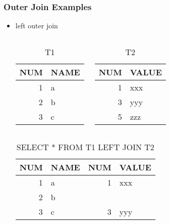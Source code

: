 \documentclass[dvipsnames]{beamer}
\theoremstyle{plain}
\begin{document}
\begin{frame}[fragile]
  \frametitle{Outer Join Examples}

  \begin{itemize}
    \item left outer join
    \begin{columns}[t]
      \begin{tiny}
      \begin{table}
        \caption{T1}
        \begin{tabular}{|r|l|}\hline
NUM & NAME \\\hline\hline
  1 & a    \\\hline
  2 & b    \\\hline
  3 & c    \\\hline
        \end{tabular}
      \end{table}
      \end{tiny}

      \begin{tiny}
      \begin{table}
        \caption{T2}
        \begin{tabular}{|r|l|}\hline
NUM & VALUE \\\hline\hline
  1 & xxx   \\\hline
  3 & yyy   \\\hline
  5 & zzz   \\\hline
        \end{tabular}
      \end{table}
      \end{tiny}
    \end{columns}

    \pause
    \begin{center}
      \begin{tiny}
      \begin{table}
        \caption{SELECT * FROM T1 LEFT JOIN T2}
        \begin{tabular}{|r|l|r|l|}\hline
NUM & NAME & NUM & VALUE \\\hline\hline
  1 & a    &   1 & xxx   \\\hline
  2 & b    &     &       \\\hline
  3 & c    &   3 & yyy   \\\hline
        \end{tabular}
      \end{table}
      \end{tiny}
    \end{center}
  \end{itemize}
\end{frame}
\end{document}
